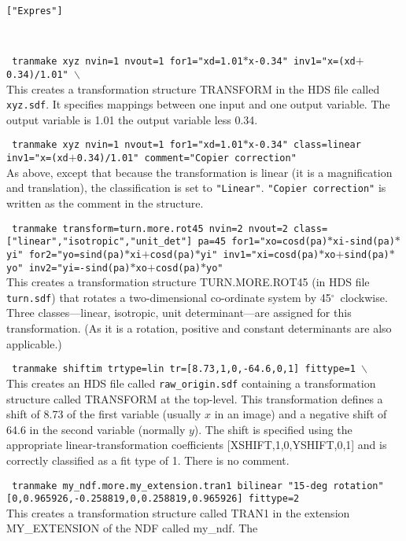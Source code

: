 \documentclass[twoside,11pt]{article}
\newcommand{\htmlref}[2]{#1}
\newcommand{\dgs}{\hbox{$^\circ$}}
\newcommand{\dgs}{{\rawhtml &deg;}}
\newcommand{\sstexamples}[1]{
   \goodbreak
   \item[Examples:] \mbox{} \\
   \vspace{-3.5ex}
   \begin{description}
      #1
   \end{description}
}
\newcommand{\sstexamplesubsection}[2]{\sloppy \item{\ssttt #1} \mbox{} \\ #2 }
\newcommand{\ssttt}{\tt}
\newcommand{\sstexamples}[1]{%
      \item[\htmlref{Examples:}{ap:example}]%
      \begin{description}
         #1
      \end{description}
   }
\newcommand{\sstexamplesubsection}[2]{%
      \item[{\ssttt #1}]
      #2\smallskip%
   }
\begin{document}
{{{         {\tt ["Expres"]}
      }
   }
   \sstexamples{
      \sstexamplesubsection{
         tranmake xyz nvin=1 nvout=1 for1="xd=1.01$*$x-0.34"
         inv1="x=(xd$+$0.34)/1.01" $\backslash$
      }{
          This creates a transformation structure TRANSFORM in the HDS
          file called {\tt xyz.sdf}.  It specifies mappings between one input and
          one output variable.  The output variable is 1.01 the output
          variable less 0.34.
      }
      \sstexamplesubsection{
         tranmake xyz nvin=1 nvout=1 for1="xd=1.01$*$x-0.34" class=linear
         inv1="x=(xd$+$0.34)/1.01" comment="Copier correction"
      }{
          As above, except that because the transformation is linear
          (it is a magnification and translation), the classification is
          set to {\tt "Linear"}.  {\tt "Copier correction"} is written
          as the comment in the structure.
      }
      \sstexamplesubsection{
         tranmake transform=turn.more.rot45 nvin=2 nvout=2
         class=["linear","isotropic","unit\_det"] pa=45
         for1="xo=cosd(pa)$*$xi-sind(pa)$*$yi"
         for2="yo=sind(pa)$*$xi$+$cosd(pa)$*$yi"
         inv1="xi=cosd(pa)$*$xo$+$sind(pa)$*$yo"
         inv2="yi=-sind(pa)$*$xo$+$cosd(pa)$*$yo"
      }{
          This creates a transformation structure TURN.MORE.ROT45
          (in HDS file {\tt turn.sdf}) that rotates
          a two-dimensional co-ordinate system by 45\dgs\ clockwise.
          Three classes---linear, isotropic, unit determinant---are
          assigned for this transformation.  (As it is
          a rotation, positive and constant determinants are also
          applicable.)
      }
      \sstexamplesubsection{
         tranmake shiftim trtype=lin tr=[8.73,1,0,-64.6,0,1] fittype=1 $\backslash$
      }{
         This creates an HDS file called {\tt raw\_origin.sdf} containing a
         transformation structure called TRANSFORM at the top-level.
         This transformation defines a shift of 8.73 of the first
         variable (usually $x$ in an image) and a negative shift of 64.6
         in the second variable (normally $y$).  The shift is specified
         using the appropriate linear-transformation coefficients
         [XSHIFT,1,0,YSHIFT,0,1] and is correctly classified as a
         fit type of 1.  There is no comment.
      }
      \sstexamplesubsection{
         tranmake my\_ndf.more.my\_extension.tran1 bilinear "15-deg rotation"
         [0,0.965926,-0.258819,0,0.258819,0.965926] fittype=2
      }{
         This creates a transformation structure called TRAN1
         in the extension MY\_EXTENSION of the NDF called my\_ndf.  The
}}}
\end{document}
